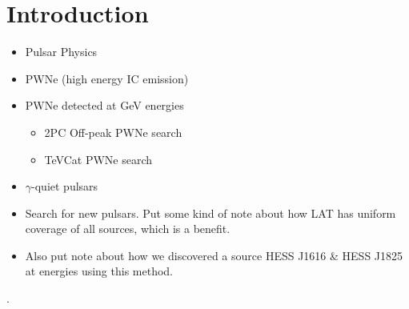 \section{Introduction}

\begin{itemize}
  \item Pulsar Physics
  \item PWNe (high energy IC emission)
  \item PWNe detected at GeV energies
  \begin{itemize}
    \item 2PC Off-peak PWNe search
    \item TeVCat PWNe search
  \end{itemize}
  \item $\gamma$-quiet pulsars
  \item Search for new pulsars. Put some kind of note about how LAT has uniform coverage of all sources, which is a benefit.
  \item Also put note about how we discovered a source HESS J1616 \& HESS J1825 at \gev energies using this method.
\end{itemize}

\citep{LAT_Collaboration_2FGL_2012}.

